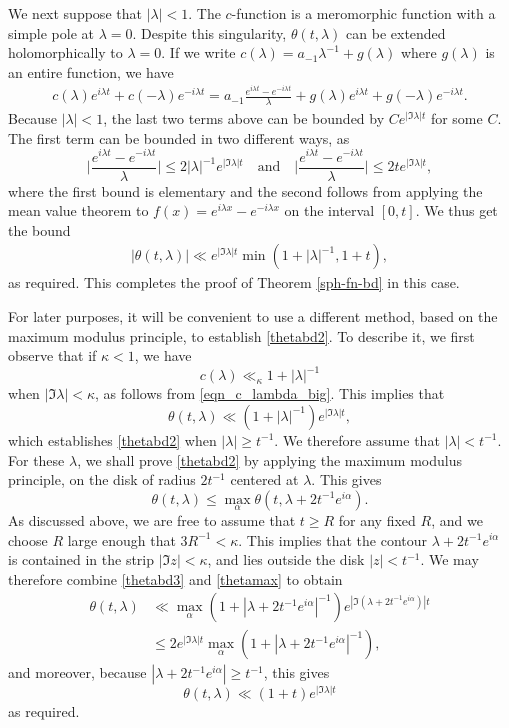 \documentclass[12pt]{amsart}
\theoremstyle{remark}
\newcommand{\be}{\begin{equation}}
\newcommand{\ee}{\end{equation}}
\begin{document}
We next suppose that $|\lambda| < 1$.  The $c$-function is a meromorphic function with a simple pole at $\lambda = 0$. Despite this singularity, $\theta(t, \lambda)$ can be extended holomorphically to $\lambda = 0$.  If we write $c(\lambda) = a_{-1}\lambda^{-1} + g(\lambda)$ where $g(\lambda)$ is an entire function, we have
\begin{gather*}
    c(\lambda) e^{i \lambda t} + c(-\lambda) e^{-i \lambda t} = a_{-1} \frac{e^{i \lambda t} - e^{-i \lambda t}}{\lambda} + g(\lambda)e^{i \lambda t} + g(-\lambda) e^{-i \lambda t}.
\end{gather*}
Because $|\lambda| < 1$, the last two terms above can be bounded by $C e^{|\Im \lambda| t}$ for some $C$. The first term can be bounded in two different ways, as
\[
\Big| \frac{e^{i \lambda t} - e^{-i \lambda t}}{\lambda} \Big| \leq 2 |\lambda|^{-1} e^{|\Im \lambda| t} \quad \text{and} \quad \Big| \frac{e^{i \lambda t} - e^{-i \lambda t}}{\lambda} \Big| \leq 2 t e^{|\Im \lambda| t},
\]
where the first bound is elementary and the second follows from applying the mean value theorem to $f(x) = e^{i \lambda x} - e^{-i \lambda x}$ on the interval $[0,t]$.  We thus get the bound
\begin{gather*}
    |\theta(t, \lambda)| \ll e^{|\Im \lambda| t} \min(1 + |\lambda|^{-1}, 1 + t),
\end{gather*}
as required.  This completes the proof of Theorem \ref{sph-fn-bd} in this case.
\medskip

For later purposes, it will be convenient to use a different method, based on the maximum modulus principle, to establish \eqref{thetabd2}. To describe it, we first observe that if $\kappa < 1$, we have
\[
c(\lambda) \ll_\kappa 1 + | \lambda |^{-1}
\]
when $| \Im \lambda | < \kappa$, as follows from \eqref{eqn_c_lambda_big}. This implies that
\be
\label{thetabd3}
\theta(t, \lambda) \ll (1 + | \lambda |^{-1}) e^{ | \Im \lambda | t},
\ee
which establishes \eqref{thetabd2} when $| \lambda | \ge t^{-1}$.  We therefore assume that $| \lambda | < t^{-1}$. For these $\lambda$, we shall prove \eqref{thetabd2} by applying the maximum modulus principle, on the disk of radius $2 t^{-1}$ centered at $\lambda$. This gives
\be
\label{thetamax}
\theta(t, \lambda) \leq \max_{\alpha} \theta(t, \lambda + 2t^{-1} e^{i\alpha}).
\ee
As discussed above, we are free to assume that $t \ge R$ for any fixed $R$, and we choose $R$ large enough that $3 R^{-1} < \kappa$. This implies that the contour $\lambda + 2t^{-1} e^{i\alpha}$ is contained in the strip $| \Im z | < \kappa$, and lies outside the disk $|z| < t^{-1}$. We may therefore combine \eqref{thetabd3} and \eqref{thetamax} to obtain
\begin{align*}
\theta(t, \lambda) & \ll \max_{\alpha} (1 + | \lambda + 2t^{-1} e^{i\alpha} |^{-1}) e^{ | \Im (\lambda + 2t^{-1} e^{i\alpha}) | t} \\
& \le 2e^{ | \Im \lambda | t} \max_{\alpha} (1 + | \lambda + 2t^{-1} e^{i\alpha} |^{-1}),
\end{align*}
and moreover, because $| \lambda + 2t^{-1} e^{i\alpha} | \ge t^{-1}$, this gives
\[
\theta(t, \lambda) \ll (1 + t)e^{ | \Im \lambda | t}
\]
as required.
\medskip
\end{document}
